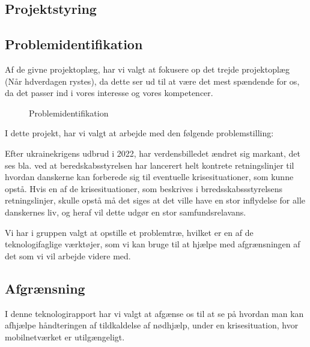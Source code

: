 \subsection{Projektstyring}


\subsection{Problemidentifikation}
Af de givne projektoplæg, har vi valgt at fokusere op det trejde projektoplæg (Når hdverdagen rystes), da dette ser ud til at være det mest spændende for os, da det passer ind i vores interesse og vores kompetencer.





\begin{figure}[h]
    \centering
    \caption{Problemidentifikation}
\end{figure}


I dette projekt, har vi valgt at arbejde med den følgende problemstilling:

Efter ukrainekrigens udbrud i 2022, har verdensbilledet ændret sig markant, det ses bla. ved at beredskabsstyrelsen har lancerert helt kontrete retningslinjer til hvordan danskerne kan forberede sig til eventuelle krisesituationer, som kunne opstå. Hvis en af de krisesituationer, som beskrives i brredsskabssstyrelsens retningslinjer, skulle opstå må det siges at det ville have en stor inflydelse for alle danskernes liv, og heraf vil dette udgør en stor samfundsrelavans.

Vi har i gruppen valgt at opstille et problemtræ, hvilket er en af de teknologifaglige værktøjer, 
som vi kan bruge til at hjælpe med afgrænsningen af det som vi vil arbejde videre med.


\subsection{Afgrænsning}
I denne teknologirapport har vi valgt at afgænse os til at se på hvordan man kan afhjælpe håndteringen af tildkaldelse af nødhjælp, under en krisesituation, hvor mobilnetværket er utilgængeligt.
 